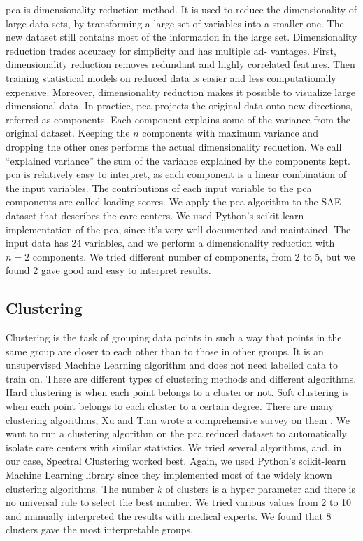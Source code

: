 \ac{pca} is dimensionality-reduction method. It is used to reduce the
dimensionality of large data sets, by transforming a large set of variables into
a smaller one. The new dataset still contains most of the information in the
large set. Dimensionality reduction trades accuracy for simplicity and has
multiple ad- vantages. First, dimensionality reduction removes redundant and
highly correlated features. Then training statistical models on reduced data is
easier and less computationally expensive. Moreover, dimensionality reduction
makes it possible to visualize large dimensional data. In practice, \ac{pca}
projects the original data onto new directions, referred as components. Each
component explains some of the variance from the original dataset. Keeping the
$n$ components with maximum variance and dropping the other ones performs the
actual dimensionality reduction. We call ``explained variance'' the sum of the
variance explained by the components kept. \ac{pca} is relatively easy to
interpret, as each component is a linear combination of the input variables. The
contributions of each input variable to the \ac{pca} components are called
loading scores. We apply the \ac{pca} algorithm to the SAE dataset that
describes the care centers. We used Python's scikit-learn
\cite{pedregosa_scikit-learn_2011} implementation of the \ac{pca}, since it's
very well documented and maintained. The input data has 24 variables, and we
perform a dimensionality reduction with $n=2$ components. We tried different
number of components, from 2 to 5, but we found 2 gave good and easy to
interpret results.
\subsection{Clustering}

Clustering is the task of grouping data points in such a way that points in the
same group are closer to each other than to those in other groups. It is an
unsupervised Machine Learning algorithm and does not need labelled data to train
on. There are different types of clustering methods and different algorithms.
Hard clustering is when each point belongs to a cluster or not. Soft clustering
is when each point belongs to each cluster to a certain degree. There are many
clustering algorithms, Xu and Tian wrote a comprehensive survey on them
\cite{xu_comprehensive_2015}. We want to run a clustering algorithm on the
\ac{pca} reduced dataset to automatically isolate care centers with similar
statistics. We tried several algorithms, and, in our case, Spectral Clustering
\cite{luxburg_tutorial_2007} worked best. Again, we used Python's scikit-learn
Machine Learning library \cite{pedregosa_scikit-learn_2011} since they
implemented most of the widely known clustering algorithms. The number $k$ of
clusters is a hyper parameter and there is no universal rule to select the best
number. We tried various values from 2 to 10 and manually interpreted the
results with medical experts. We found that 8 clusters gave the most
interpretable groups.

